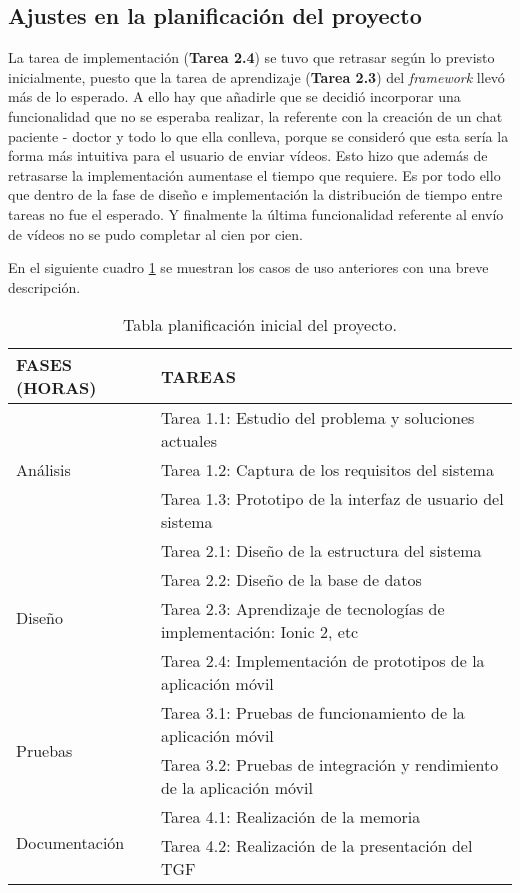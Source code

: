 \subsection{Ajustes en la planificación del proyecto}
La tarea de implementación (\textbf{Tarea 2.4}) se tuvo que retrasar según lo previsto inicialmente,
puesto que la tarea de aprendizaje (\textbf{Tarea 2.3}) del \textit{framework} llevó más de lo esperado.
A ello hay que añadirle que se decidió incorporar una funcionalidad que no se esperaba realizar,
la referente con la creación de un chat paciente - doctor y todo lo que ella conlleva, porque se
consideró que esta sería la forma más intuitiva para el usuario de enviar vídeos. Esto hizo que además
de retrasarse la implementación aumentase el tiempo que requiere. Es por todo ello que
dentro de la fase de diseño e implementación la distribución de tiempo entre tareas no fue el esperado.
Y finalmente la última funcionalidad referente al envío de vídeos no se pudo completar al cien por cien.

\medskip
En el siguiente cuadro \ref{planificacion-inicial} se muestran los casos de uso anteriores con una breve descripción.
\begin{table}
    \begin{tabular}{|lp{12cm}|}
        \hline
        FASES (HORAS) & TAREAS \\ \hline

        \multirow{3}{*}{Análisis}
        \multirow{3}{*}{(70)}
        & Tarea 1.1: Estudio del problema y soluciones actuales \\
        & Tarea 1.2: Captura de los requisitos del sistema \\
        & Tarea 1.3: Prototipo de la interfaz de usuario del sistema \\ \hline

        \multirow{4}{*}{Diseño}
        \multirow{4}{*}{(160)}
        & Tarea 2.1: Diseño de la estructura del sistema \\
        & Tarea 2.2: Diseño de la base de datos \\
        & Tarea 2.3: Aprendizaje de tecnologías de implementación: Ionic 2, etc \\
        & Tarea 2.4: Implementación de prototipos de la aplicación móvil \\ \hline

        \multirow{2}{*}{Pruebas}
        \multirow{2}{*}{(30)}
        & Tarea 3.1: Pruebas de funcionamiento de la aplicación móvil \\
        & Tarea 3.2: Pruebas de integración y rendimiento de la aplicación móvil \\ \hline

        \multirow{2}{*}{Documentación}
        \multirow{2}{*}{(40)}
        & Tarea 4.1: Realización de la memoria \\
        & Tarea 4.2: Realización de la presentación del TGF \\ \hline
    \end{tabular}

    \caption{Tabla planificación inicial del proyecto.}\label{planificacion-inicial}
\end{table}